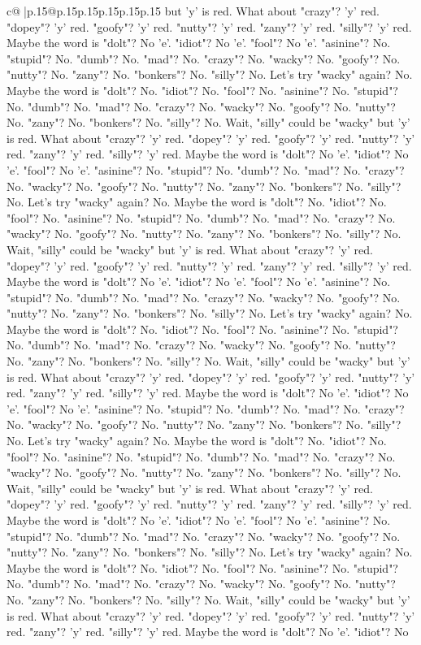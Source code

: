 \documentclass{article}
\begin{document}
{\begin{supertabular}{c@{$\;$}|p{.15\linewidth}@{}p{.15\linewidth}p{.15\linewidth}p{.15\linewidth}p{.15\linewidth}p{.15\linewidth}}
{{{but 'y' is red. What about "crazy"? 'y' red. "dopey"? 'y' red. "goofy"? 'y' red. "nutty"? 'y' red. "zany"? 'y' red. "silly"? 'y' red. Maybe the word is "dolt"? No 'e'. "idiot"? No 'e'. "fool"? No 'e'. "asinine"? No. "stupid"? No. "dumb"? No. "mad"? No. "crazy"? No. "wacky"? No. "goofy"? No. "nutty"? No. "zany"? No. "bonkers"? No. "silly"? No. Let's try "wacky" again? No. Maybe the word is "dolt"? No. "idiot"? No. "fool"? No. "asinine"? No. "stupid"? No. "dumb"? No. "mad"? No. "crazy"? No. "wacky"? No. "goofy"? No. "nutty"? No. "zany"? No. "bonkers"? No. "silly"? No. Wait, "silly" could be "wacky" but 'y' is red. What about "crazy"? 'y' red. "dopey"? 'y' red. "goofy"? 'y' red. "nutty"? 'y' red. "zany"? 'y' red. "silly"? 'y' red. Maybe the word is "dolt"? No 'e'. "idiot"? No 'e'. "fool"? No 'e'. "asinine"? No. "stupid"? No. "dumb"? No. "mad"? No. "crazy"? No. "wacky"? No. "goofy"? No. "nutty"? No. "zany"? No. "bonkers"? No. "silly"? No. Let's try "wacky" again? No. Maybe the word is "dolt"? No. "idiot"? No. "fool"? No. "asinine"? No. "stupid"? No. "dumb"? No. "mad"? No. "crazy"? No. "wacky"? No. "goofy"? No. "nutty"? No. "zany"? No. "bonkers"? No. "silly"? No. Wait, "silly" could be "wacky" but 'y' is red. What about "crazy"? 'y' red. "dopey"? 'y' red. "goofy"? 'y' red. "nutty"? 'y' red. "zany"? 'y' red. "silly"? 'y' red. Maybe the word is "dolt"? No 'e'. "idiot"? No 'e'. "fool"? No 'e'. "asinine"? No. "stupid"? No. "dumb"? No. "mad"? No. "crazy"? No. "wacky"? No. "goofy"? No. "nutty"? No. "zany"? No. "bonkers"? No. "silly"? No. Let's try "wacky" again? No. Maybe the word is "dolt"? No. "idiot"? No. "fool"? No. "asinine"? No. "stupid"? No. "dumb"? No. "mad"? No. "crazy"? No. "wacky"? No. "goofy"? No. "nutty"? No. "zany"? No. "bonkers"? No. "silly"? No. Wait, "silly" could be "wacky" but 'y' is red. What about "crazy"? 'y' red. "dopey"? 'y' red. "goofy"? 'y' red. "nutty"? 'y' red. "zany"? 'y' red. "silly"? 'y' red. Maybe the word is "dolt"? No 'e'. "idiot"? No 'e'. "fool"? No 'e'. "asinine"? No. "stupid"? No. "dumb"? No. "mad"? No. "crazy"? No. "wacky"? No. "goofy"? No. "nutty"? No. "zany"? No. "bonkers"? No. "silly"? No. Let's try "wacky" again? No. Maybe the word is "dolt"? No. "idiot"? No. "fool"? No. "asinine"? No. "stupid"? No. "dumb"? No. "mad"? No. "crazy"? No. "wacky"? No. "goofy"? No. "nutty"? No. "zany"? No. "bonkers"? No. "silly"? No. Wait, "silly" could be "wacky" but 'y' is red. What about "crazy"? 'y' red. "dopey"? 'y' red. "goofy"? 'y' red. "nutty"? 'y' red. "zany"? 'y' red. "silly"? 'y' red. Maybe the word is "dolt"? No 'e'. "idiot"? No 'e'. "fool"? No 'e'. "asinine"? No. "stupid"? No. "dumb"? No. "mad"? No. "crazy"? No. "wacky"? No. "goofy"? No. "nutty"? No. "zany"? No. "bonkers"? No. "silly"? No. Let's try "wacky" again? No. Maybe the word is "dolt"? No. "idiot"? No. "fool"? No. "asinine"? No. "stupid"? No. "dumb"? No. "mad"? No. "crazy"? No. "wacky"? No. "goofy"? No. "nutty"? No. "zany"? No. "bonkers"? No. "silly"? No. Wait, "silly" could be "wacky" but 'y' is red. What about "crazy"? 'y' red. "dopey"? 'y' red. "goofy"? 'y' red. "nutty"? 'y' red. "zany"? 'y' red. "silly"? 'y' red. Maybe the word is "dolt"? No 'e'. "idiot"? No }}}
\end{supertabular}}
\end{document}
